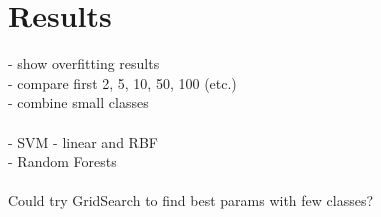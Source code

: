 \chapter{Results}
\label{chap:results}

- show overfitting results \\ 
- compare first 2, 5, 10, 50, 100 (etc.) \\
- combine small classes \\ \\

- SVM - linear and RBF \\
- Random Forests \\ \\

Could try GridSearch to find best params with few classes? 
